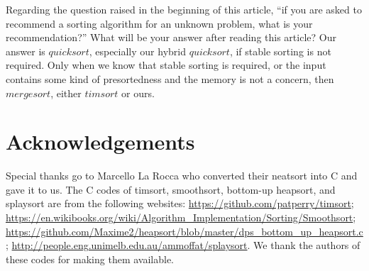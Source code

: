 \documentclass[AMA,STIX1COL]{WileyNJD-v2}
\newcommand{\qusortn}{$quicksort$}
\newcommand{\tsort}{$timsort$ }
\newcommand{\msortn}{$mergesort$}
\begin{document}
Regarding the question raised in the beginning of this article, “if you are asked to recommend a sorting algorithm for an unknown problem, what is your recommendation?”  What will be your answer after reading this article?  Our answer is \qusortn, especially our hybrid \qusortn, if stable sorting is not required. Only when we know that stable sorting is required, or the input contains some kind of presortedness and the memory is not a concern, then \msortn, either \tsort or ours.


\section{Acknowledgements} 
Special thanks go to Marcello La Rocca who converted their neatsort into C and gave it to us. 
The C codes of timsort, smoothsort, bottom-up heapsort, and splaysort are from the following websites: 
\url{https://github.com/patperry/timsort};
\url{https://en.wikibooks.org/wiki/Algorithm_Implementation/Sorting/Smoothsort};
\url{https://github.com/Maxime2/heapsort/blob/master/dps\_bottom\_up\_heapsort.c};
\url{http://people.eng.unimelb.edu.au/ammoffat/splaysort}.
We thank the authors of these codes for making them available. 



\appendix
\end{document}

